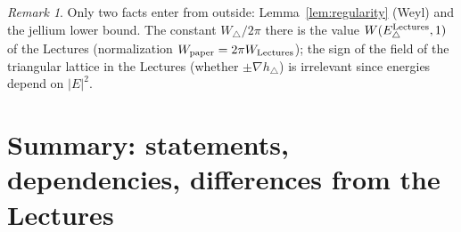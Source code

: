 \documentclass[11pt]{article}
\theoremstyle{definition}
\theoremstyle{remark}
\newtheorem{remark}[theorem]{Remark}
\begin{document}
\begin{remark}
Only two facts enter from outside: Lemma~\ref{lem:regularity} (Weyl) and the jellium lower bound.  The constant $W_\triangle/2\pi$ there is the value $W(E_\triangle^{\rm Lectures},1)$ of the Lectures (normalization $W_{\rm paper}=2\pi W_{\rm Lectures}$); the sign of the field of the triangular lattice in the Lectures (whether $\pm\nabla h_\triangle$) is irrelevant since energies depend on $|E|^2$.
\end{remark}

\section{Summary: statements, dependencies, differences from the Lectures}
\end{document}
